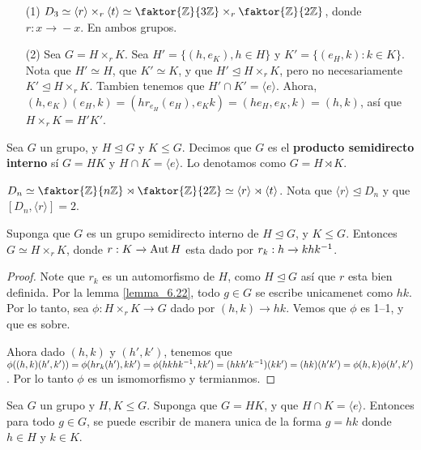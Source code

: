 \begin{example}\label{}
    \begin{enumerate}
        \item[(1)] $D_3 \simeq \langle r \rangle \times_r \langle t \rangle
            \simeq \faktor{\Z}{3\Z} \times_r \faktor{\Z}{2\Z}$, donde $r:x
            \xrightarrow{} -x$. En ambos grupos.

        \item[(2)] Sea $G=H \times_r K$. Sea  $H'=\{(h,e_K), h \in H\}$ y
            $K'=\{(e_H,k): k \in K\}$. Nota que $H' \simeq H$, que  $K' \simeq
            K$, y que  $H' \unlhd H \times_r K$, pero no necesariamente  $K'
            \unlhd H \times_r K$. Tambien tenemos que $H' \cap K'=\langle e
            \rangle$. Ahora, $(h,e_K)(e_H,k)=(hr_{e_H}(e_H),
            e_Kk)=(he_H,e_K,k)=(h,k)$, as\'i que $H \times_r K =H'K'$.
    \end{enumerate}
\end{example}

\begin{definition}
    Sea $G$ un grupo, y  $H \unlhd G$ y  $K \leq G$. Decimos que  $G$ es el
     \textbf{producto semidirecto interno} s\'i $G=HK$ y  $H \cap K=\langle e
     \rangle$. Lo denotamos como $G=H \rtimes K$.
\end{definition}

\begin{example}\label{}
    $D_n \simeq \faktor{\Z}{n\Z} \rtimes \faktor{\Z}{2\Z} \simeq \langle r
    \rangle \rtimes \langle t \rangle$. Nota que $\langle r \rangle \unlhd D_n$
    y que $[D_n,\langle r \rangle]=2$.
\end{example}

\begin{lemma}\label{lemma_6.24}
    Suponga que $G$ es un grupo semidirecto interno de  $H \unlhd G$, y  $K \leq
    G$. Entonces  $G \simeq H \times_r K$, donde  $r:K \xrightarrow{} \operatorname{Aut}{H}$
    esta dado por $r_k:h \xrightarrow{} khk^{-1}$.
\end{lemma}
\begin{proof}
    Note que $r_k$ es un automorfismo de $H$, como $H \unlhd G$ as\'i que $r$
    esta bien definida. Por la lemma \ref{lemma_6.22}, todo $g \in G$ se escribe
    unicamenet como  $hk$. Por lo tanto, sea  $\phi:H \times_r K \xrightarrow{}
    G$ dado por $(h,k) \xrightarrow{} hk$. Vemos que $\phi$ es 1--1, y que es
    sobre.

    Ahora dado $(h,k)$ y $(h',k')$, tenemos que
    $\phi((h,k)(h',k'))=\phi(hr_k(h'),kk')=\phi(hkhk^{-1},
    kk')=(hkh'k^{-1})(kk')=(hk)(h'k')=\phi(h,k)\phi(h',k')$. Por lo tanto
    $\phi$ es un ismomorfismo y termianmos.
\end{proof}

\begin{lemma}\label{lemma_6.25}
    Sea $G$ un grupo y  $H,K \leq G$. Suponga que  $G=HK$, y que  $H \cap
    K=\langle e \rangle$. Entonces para todo $g \in G$, se puede escribir de
    manera unica de la forma  $g=hk$ donde  $h \in H$ y  $k \in K$.
\end{lemma}
